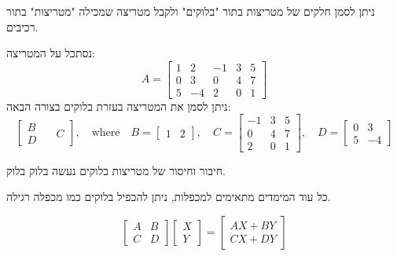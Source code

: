 \documentclass{tstextbook}
\begin{document}
\begin{definition}
ניתן לסמן חלקים של מטריצות בתור "בלוקים" ולקבל מטריצה שמכילה "מטריצות" בתור רכיבים.

\end{definition}
\begin{example}
נסתכל על המטריצה:
$$A=\begin{bmatrix}1&2&-1&3&5\\ 0&3&0&4&7\\ 5&-4&2&0&1\end{bmatrix}$$
ניתן לסמן את המטריצה בעזרת בלוקים בצורה הבאה:
$$\left[ \begin{array}{c} B \\ D \end{array} \quad  \begin{array}{c} C \end{array} \right],\quad\text{where}\quad B=\begin{bmatrix}1&2\end{bmatrix},\quad C=\begin{bmatrix}-1&3&5\\ 0&4&7\\ 2&0&1\end{bmatrix},\quad D=\begin{bmatrix}0&3\\ 5&-4\end{bmatrix}$$

\end{example}
\begin{proposition}
חיבור וחיסור של מטריצות בלוקים נעשה בלוק בלוק.

\end{proposition}
\begin{proposition}
כל עוד המימדים מתאימים למכפלות, ניתן להכפיל בלוקים כמו מכפלה רגילה.

\end{proposition}
\begin{example}
$${\begin{bmatrix}A&B\\ C&D\end{bmatrix}}\begin{bmatrix}X\\ Y\end{bmatrix}={\begin{bmatrix}A X+B Y\\ C X+D Y\end{bmatrix}}$$

\end{example}
\end{document}
